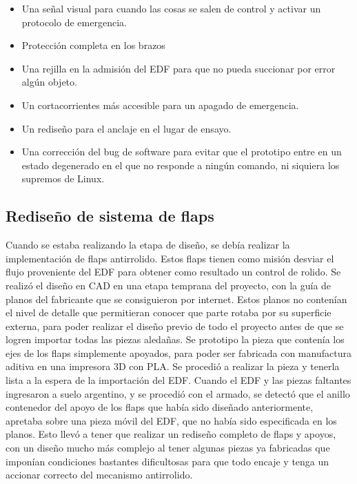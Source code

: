 \begin{itemize}
    \item Una señal visual para cuando las cosas se salen de control y activar un protocolo de emergencia.
    \item Protección completa en los brazos
    \item Una rejilla en la admisión del EDF para que no pueda succionar por error algún objeto.
    \item Un cortacorrientes más accesible para un apagado de emergencia.
    \item Un rediseño para el anclaje en el lugar de ensayo.
    \item Una corrección del bug de software para evitar que el prototipo entre en un estado degenerado en el que no responde a ningún comando, ni siquiera los supremos de Linux.
\end{itemize}

\subsection{Rediseño de sistema de flaps}

Cuando se estaba realizando la etapa de diseño, se debía realizar la implementación de flaps antirrolido. Estos flaps tienen como misión desviar el flujo proveniente del EDF para obtener como resultado un control de rolido. Se realizó el diseño en CAD en una etapa temprana del proyecto, con la guía de planos del fabricante que se consiguieron por internet. Estos planos no contenían el nivel de detalle que permitieran conocer que parte rotaba por su superficie externa, para poder realizar el diseño previo de todo el proyecto antes de que se logren importar todas las piezas aledañas. Se prototipo la pieza que contenía los ejes de los flaps simplemente apoyados, para poder ser fabricada con manufactura aditiva en una impresora 3D con PLA. Se procedió a realizar la pieza y tenerla lista a la espera de la importación del EDF. Cuando el EDF y las piezas faltantes ingresaron a suelo argentino, y se procedió con el armado, se detectó que el anillo contenedor del apoyo de los flaps que había sido diseñado anteriormente, apretaba sobre una pieza móvil del EDF, que no había sido especificada en los planos. Esto llevó a tener que realizar un rediseño completo de flaps y apoyos, con un diseño mucho más complejo al tener algunas piezas ya fabricadas que imponían condiciones bastantes dificultosas para que todo encaje y tenga un accionar correcto del mecanismo antirrolido.

